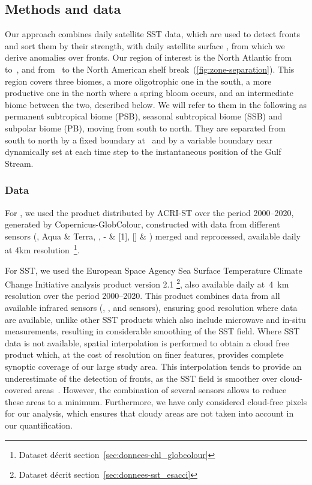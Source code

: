 \subsection{Methods and data}

Our approach combines daily satellite SST data, which are used to detect fronts and sort them by their strength, with daily satellite surface , from which we derive anomalies over fronts.
Our region of interest is the North Atlantic from~ to~, and from~ to the North American shelf break~(\cref{fig:zone-separation}).
This region covers three biomes, a more oligotrophic one in the south, a more productive one in the north where a spring bloom occurs, and an intermediate biome between the two, described below.
We will refer to them in the following as permanent subtropical biome (PSB), seasonal subtropical biome (SSB) and subpolar biome (PB), moving from south to north.
They are separated from south to north by a fixed boundary at~ and by a variable boundary near~ dynamically set at each time step to the instantaneous position of the Gulf Stream.

\subsubsection{Data}

For , we used the  product distributed by ACRI-ST over the period 2000--2020, generated by Copernicus-GlobColour, constructed with data from different sensors (,  Aqua \& Terra, , - \& [1], [] \& ) merged and reprocessed, available daily at 4km resolution~\parencite{article_chl}\footnote{Dataset  décrit section~\ref{sec:donnees-chl_globcolour}}.

For SST, we used the European Space Agency Sea Surface Temperature Climate Change Initiative analysis product version 2.1 \parencite{merchant_2019, article_sst, good_2020}\footnote{Dataset  décrit section~\ref{sec:donnees-sst_esacci}}, also available daily at~\qty{4}{\km} resolution over the period 2000--2020.
This product combines data from all available infrared sensors (, , and  sensors), ensuring good resolution where data are available, unlike other SST products which also include microwave and in-situ measurements, resulting in considerable smoothing of the SST field. %
Where SST data is not available, spatial interpolation is performed to obtain a cloud free product which, at the cost of resolution on finer features, provides complete synoptic coverage of our large study area.
This interpolation tends to provide an underestimate of the detection of fronts, as the SST field is smoother over cloud-covered areas~\parencite{merchant_2019}.
However, the combination of several sensors allows to reduce these areas to a minimum.
Furthermore, we have only considered cloud-free pixels for our analysis, which ensures that cloudy areas are not taken into account in our quantification.


